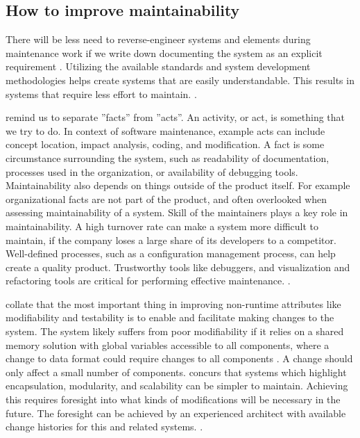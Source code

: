 \documentclass[utf8,english]{gradu3}
\begin{document}
\subsection{How to improve maintainability}

There will be less need to reverse-engineer systems and elements during
maintenance work if we write down documenting the system as an explicit
requirement \parencite[96]{IEEE12207}. Utilizing the available standards and
system development methodologies helps create systems that are easily
understandable.  This results in systems that require less effort to maintain.
\parencite[608]{Gorla2010}.

\textcite{Broy2006} remind us to separate ''facts'' from ''acts''. An activity,
or act, is something that we try to do. In context of software maintenance, example acts can include concept
location, impact analysis, coding, and modification. A fact is some
circumstance surrounding the system, such as readability of documentation,
processes used in the organization, or availability of debugging tools.
Maintainability also depends on things outside of the product itself.  For
example organizational facts are not part of the product, and often overlooked
when assessing maintainability of a system. Skill of the maintainers plays a key
role in maintainability. A high turnover rate can make a system more difficult
to maintain, if the company loses a large share of its developers to a
competitor. Well-defined processes, such as a configuration management process,
can help create a quality product.  Trustworthy tools like debuggers, and
visualization and refactoring tools are critical for performing effective
maintenance. \parencite[25-26]{Broy2006}.

\textcite{Bass1998} collate that the most important thing in improving
non-runtime attributes like modifiability and testability is to enable and
facilitate making changes to the system. The system likely suffers from poor
modifiability if it relies on a shared memory solution with global variables
accessible to all components, where a change to data format could require
changes to all components \parencite[89]{Bass1998}. A change should only affect
a small number of components. \textcite[96]{IEEE12207} concurs that systems
which highlight encapsulation, modularity, and scalability can be simpler to
maintain. Achieving this requires foresight into what kinds of modifications
will be necessary in the future. The foresight can be achieved by an experienced
architect with available change histories for this and related systems.
\parencite[118]{Bass1998}.
\end{document}

